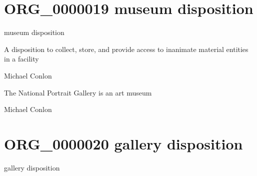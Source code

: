 \documentclass[letterpaper,10pt,english]{sphinxmanual}
\begin{document}
\section{ORG\_0000019 \sphinxhyphen{} museum disposition}
\label{\detokenize{doc-ORG_0000019:org-0000019-museum-disposition}}\label{\detokenize{doc-ORG_0000019:index-0}}\label{\detokenize{doc-ORG_0000019::doc}}
\begin{sphinxShadowBox}

\sphinxAtStartPar
museum disposition
\end{sphinxShadowBox}

\begin{sphinxShadowBox}

\sphinxAtStartPar
A disposition to collect, store, and provide access to inanimate material entities in a facility
\end{sphinxShadowBox}

\begin{sphinxShadowBox}

\sphinxAtStartPar
Michael Conlon 
\end{sphinxShadowBox}

\begin{sphinxShadowBox}

\sphinxAtStartPar
The National Portrait Gallery is an art museum
\end{sphinxShadowBox}

\begin{sphinxShadowBox}

\sphinxAtStartPar
Michael Conlon 
\end{sphinxShadowBox}
\begin{quote}
\label{\detokenize{doc-ORG_0000020:org-0000020}}\label{\detokenize{doc-ORG_0000020:gallery-disposition}}\label{\detokenize{doc-ORG_0000020:org-0000020}}
\ignorespaces \end{quote}


\section{ORG\_0000020 \sphinxhyphen{} gallery disposition}
\label{\detokenize{doc-ORG_0000020:org-0000020-gallery-disposition}}\label{\detokenize{doc-ORG_0000020:index-0}}\label{\detokenize{doc-ORG_0000020::doc}}
\begin{sphinxShadowBox}

\sphinxAtStartPar
gallery disposition
\end{sphinxShadowBox}
\end{document}
